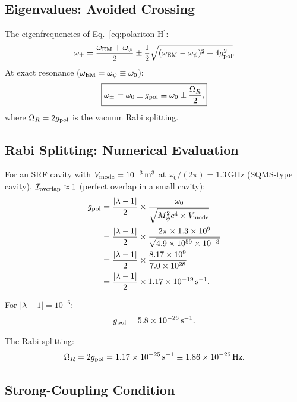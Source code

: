 \documentclass[aps,prd,twocolumn,superscriptaddress]{revtex4-2}
\begin{document}
\subsection{Eigenvalues: Avoided Crossing}

The eigenfrequencies of Eq.~\eqref{eq:polariton-H}:
\begin{equation}
\omega_\pm = \frac{\omega_{\rm EM} + \omega_\psi}{2}
\pm\frac{1}{2}\sqrt{(\omega_{\rm EM}-\omega_\psi)^2 + 4g_{\rm pol}^2}.
\label{eq:avoided-crossing}
\end{equation}
At exact resonance ($\omega_{\rm EM} = \omega_\psi \equiv \omega_0$):
\begin{equation}
\boxed{
\omega_\pm = \omega_0 \pm g_{\rm pol}
\equiv \omega_0 \pm \frac{\Omega_R}{2},
}
\label{eq:Rabi-splitting}
\end{equation}
where $\Omega_R = 2g_{\rm pol}$ is the vacuum Rabi splitting.

\subsection{Rabi Splitting: Numerical Evaluation}

For an SRF cavity with $V_{\rm mode} = 10^{-3}\,\text{m}^3$ at
$\omega_0/(2\pi) = 1.3$\,GHz (SQMS-type cavity), $\mathcal{I}_{\rm overlap}
\approx 1$ (perfect overlap in a small cavity):
\begin{align}
g_{\rm pol} &= \frac{|\lambda-1|}{2}\times
\frac{\omega_0}{\sqrt{M_\psi^2 c^4\times V_{\rm mode}}}
\nonumber\\
&= \frac{|\lambda-1|}{2}\times
\frac{2\pi\times1.3\times10^9}{\sqrt{4.9\times10^{59}\times10^{-3}}}
\nonumber\\
&= \frac{|\lambda-1|}{2}\times
\frac{8.17\times10^9}{7.0\times10^{28}}
\nonumber\\
&= \frac{|\lambda-1|}{2}\times1.17\times10^{-19}\,\text{s}^{-1}.
\end{align}

For $|\lambda-1| = 10^{-6}$:
\begin{equation}
g_{\rm pol} = 5.8\times10^{-26}\,\text{s}^{-1}.
\end{equation}

The Rabi splitting:
\begin{equation}
\Omega_R = 2g_{\rm pol} = 1.17\times10^{-25}\,\text{s}^{-1}
\equiv 1.86\times10^{-26}\,\text{Hz}.
\end{equation}

\subsection{Strong-Coupling Condition}
\end{document}
